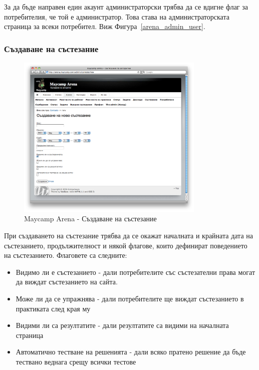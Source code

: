 \documentclass[a4paper,12pt]{article}
\begin{document}
  За да бъде направен един акаунт администраторски трябва да се вдигне флаг за потребителия, че той е администратор. Това става на администраторската страница за всеки потребител. Виж Фигура~\ref{arena_admin_user}.
  
  \pagebreak
  
  \subsubsection{Създаване на състезание}

  \begin{figure}[ht]
    \begin{center}
      \includegraphics[width=0.8\textwidth]{maycamp_arena_admin_contest.png}
    \end{center}
    \caption{Maycamp Arena - Създаване на състезание}
    \label{arena_admin_contest}
  \end{figure}
  
  При създаването на състезание трябва да се окажат началната и крайната дата на състезанието, продължителност и някой флагове, които дефинират поведението на състезанието. Флаговете са следните:
  \begin{itemize}
    \item Видимо ли е състезанието - дали потребителите със състезателни права могат да виждат състезанието на сайта.
    \item Може ли да се упражнява - дали потребителите ще виждат състезанието в практиката след края му
    \item Видими ли са резултатите - дали резултатите са видими на началната страница
    \item Автоматично тестване на решенията - дали всяко пратено решение да бъде тествано веднага срещу всички тестове
  \end{itemize}
  
\end{document}
